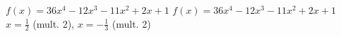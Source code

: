 {$f(x) = 36x^{4} - 12x^{3} - 11x^{2} + 2x + 1$}
{$f(x) = 36x^{4} - 12x^{3} - 11x^{2} + 2x + 1$ \\ $x = \frac{1}{2}$ (mult. 2), $x = -\frac{1}{3}$ (mult. 2)}